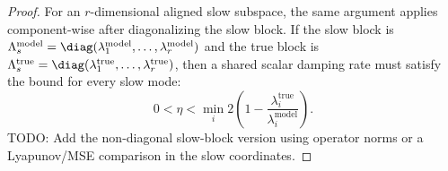 \begin{proof}
For an $r$-dimensional aligned slow subspace, the same argument applies
component-wise after diagonalizing the slow block. If the slow block is
$\Lambda_s^{\mathrm{model}}=\diag(\lambda_1^{\mathrm{model}},\ldots,\lambda_r^{\mathrm{model}})$
and the true block is
$\Lambda_s^{\mathrm{true}}=\diag(\lambda_1^{\mathrm{true}},\ldots,\lambda_r^{\mathrm{true}})$,
then a shared scalar damping rate must satisfy the bound for every slow mode:
\begin{equation}
    0 < \eta <
    \min_i 2\left(
        1-\frac{\lambda_i^{\mathrm{true}}}{\lambda_i^{\mathrm{model}}}
    \right).
\end{equation}
TODO: Add the non-diagonal slow-block version using operator norms or a
Lyapunov/MSE comparison in the slow coordinates.
\end{proof}
